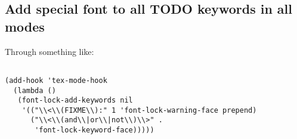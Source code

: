 \documentclass[11pt]{article}
\begin{document}
\subsection{Add special font to all TODO keywords in all modes}
\label{sec:org5646bf8}
Through something like:

\begin{verbatim}

(add-hook 'tex-mode-hook
  (lambda ()
   (font-lock-add-keywords nil
    '(("\\<\\(FIXME\\):" 1 'font-lock-warning-face prepend)
      ("\\<\\(and\\|or\\|not\\)\\>" .
       'font-lock-keyword-face)))))


\end{verbatim}
\end{document}
